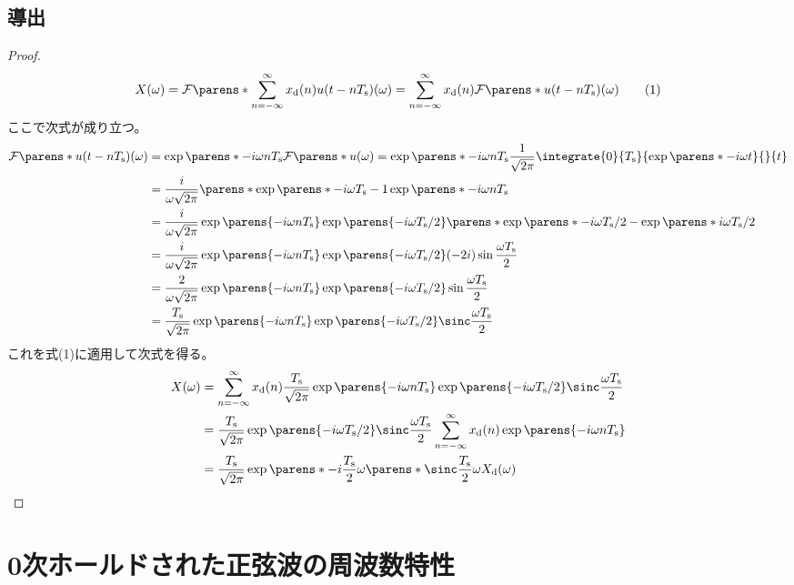         \subsection{導出}
            \begin{proof}
                \quad\par
                \[ X(\omega) = \FT{\sum_{n=-\infty}^\infty \xd(n)u(t-n\Ts)}(\omega) = \sum_{n=-\infty}^\infty \xd(n)\FT{u(t-n\Ts)}(\omega) \tag{1} \]
                ここで次式が成り立つ。
                \begin{align*}
                    \FT{u(t-n\Ts)}(\omega) &= \exp\parens*{-i \omega n\Ts}\FT{u}(\omega) = \exp\parens*{-i \omega n\Ts}\frac{1}{\sqrt{2\pi}}\integrate{0}{\Ts}{\exp\parens*{-i\omega t}}{}{t} \\
                    &= \frac{i}{\omega\sqrt{2\pi}}\parens*{\exp\parens*{-i \omega\Ts}-1}\exp\parens*{-i \omega n\Ts} \\
                    &= \frac{i}{\omega\sqrt{2\pi}}\exp\parens{-i \omega n\Ts}\exp\parens{-i \omega\Ts/2}\parens*{\exp\parens*{-i \omega\Ts/2} - \exp\parens*{i \omega\Ts/2}} \\
                    &= \frac{i}{\omega\sqrt{2\pi}}\exp\parens{-i \omega n\Ts}\exp\parens{-i \omega\Ts/2}(-2i)\sin\frac{\omega\Ts}{2} \\
                    &= \frac{2}{\omega\sqrt{2\pi}}\exp\parens{-i \omega n\Ts}\exp\parens{-i \omega\Ts/2}\sin\frac{\omega\Ts}{2} \\
                    &= \frac{\Ts}{\sqrt{2\pi}}\exp\parens{-i \omega n\Ts}\exp\parens{-i \omega\Ts/2}\sinc\frac{\omega\Ts}{2}
                \end{align*}
                これを式(1)に適用して次式を得る。
                \begin{align*}
                    X(\omega) &= \sum_{n=-\infty}^\infty \xd(n)\frac{\Ts}{\sqrt{2\pi}}\exp\parens{-i \omega n\Ts}\exp\parens{-i \omega\Ts/2}\sinc\frac{\omega\Ts}{2} \\
                    &= \frac{\Ts}{\sqrt{2\pi}}\exp\parens{-i \omega\Ts/2}\sinc\frac{\omega\Ts}{2} \sum_{n=-\infty}^\infty \xd(n)\exp\parens{-i \omega n\Ts} \\
                    &= \frac{\Ts}{\sqrt{2\pi}}\exp\parens*{-i\frac{\Ts}{2}\omega}\parens*{\sinc \frac{\Ts}{2}\omega}\Xd(\omega)
                \end{align*}
            \end{proof}
    \section{0次ホールドされた正弦波の周波数特性}
        \label{0次ホールドされた正弦波の周波数特性}
